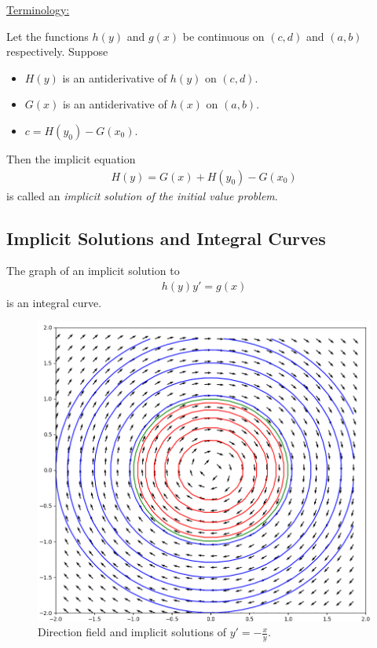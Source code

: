 \documentclass[12pt,a4paper]{article}
\begin{document}
\vfill

\underline{Terminology:}

Let the functions $h(y)$ and $g(x)$ be continuous on $(c, d)$ and $(a, b)$ respectively. Suppose
	\begin{itemize}
	\item $H(y)$ is an antiderivative of $h(y)$ on $(c, d)$.
	\item $G(x)$ is an antiderivative of $h(x)$ on $(a, b)$.
	\item $c = H (y_0) - G(x_0)$.
	\end{itemize}
Then the implicit equation
	\begin{align*}
	H(y) = G(x) + H(y_0) - G(x_0)
	\end{align*}
is called an \textit{implicit solution of the initial value problem}.

\newpage

\subsection{Implicit Solutions and Integral Curves}
The graph of an implicit solution to
	\begin{align*}
	h(y) y' = g(x)
	\end{align*}
is an integral curve. 

\begin{figure}[h]
\centering
\includegraphics[scale=0.42]{Fig-ex02.png}
\caption{Direction field and implicit solutions of $y' = -\frac{x}{y}$.}
\end{figure}
\end{document}
